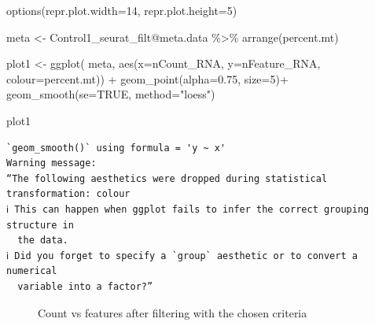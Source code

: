 \documentclass[
  letterpaper,
  DIV=11,
  numbers=noendperiod]{scrartcl}
\newenvironment{Shaded}{\begin{snugshade}}{\end{snugshade}}
\newcommand{\AttributeTok}[1]{\textcolor[rgb]{0.40,0.45,0.13}{#1}}
\newcommand{\ConstantTok}[1]{\textcolor[rgb]{0.56,0.35,0.01}{#1}}
\newcommand{\DecValTok}[1]{\textcolor[rgb]{0.68,0.00,0.00}{#1}}
\newcommand{\FloatTok}[1]{\textcolor[rgb]{0.68,0.00,0.00}{#1}}
\newcommand{\FunctionTok}[1]{\textcolor[rgb]{0.28,0.35,0.67}{#1}}
\newcommand{\NormalTok}[1]{\textcolor[rgb]{0.00,0.23,0.31}{#1}}
\newcommand{\OtherTok}[1]{\textcolor[rgb]{0.00,0.23,0.31}{#1}}
\newcommand{\SpecialCharTok}[1]{\textcolor[rgb]{0.37,0.37,0.37}{#1}}
\newcommand{\StringTok}[1]{\textcolor[rgb]{0.13,0.47,0.30}{#1}}
\begin{document}
\begin{Shaded}
\begin{Highlighting}[]
\FunctionTok{options}\NormalTok{(}\AttributeTok{repr.plot.width=}\DecValTok{14}\NormalTok{, }\AttributeTok{repr.plot.height=}\DecValTok{5}\NormalTok{)}

\NormalTok{meta }\OtherTok{\textless{}{-}}\NormalTok{ Control1\_seurat\_filt}\SpecialCharTok{@}\NormalTok{meta.data }\SpecialCharTok{\%\textgreater{}\%} \FunctionTok{arrange}\NormalTok{(percent.mt)}

\NormalTok{plot1 }\OtherTok{\textless{}{-}} \FunctionTok{ggplot}\NormalTok{( meta, }\FunctionTok{aes}\NormalTok{(}\AttributeTok{x=}\NormalTok{nCount\_RNA, }\AttributeTok{y=}\NormalTok{nFeature\_RNA, }\AttributeTok{colour=}\NormalTok{percent.mt)) }\SpecialCharTok{+} 
         \FunctionTok{geom\_point}\NormalTok{(}\AttributeTok{alpha=}\FloatTok{0.75}\NormalTok{, }\AttributeTok{size=}\DecValTok{5}\NormalTok{)}\SpecialCharTok{+}
         \FunctionTok{geom\_smooth}\NormalTok{(}\AttributeTok{se=}\ConstantTok{TRUE}\NormalTok{, }\AttributeTok{method=}\StringTok{"loess"}\NormalTok{)}

\NormalTok{plot1}
\end{Highlighting}
\end{Shaded}

\begin{verbatim}
`geom_smooth()` using formula = 'y ~ x'
Warning message:
“The following aesthetics were dropped during statistical transformation: colour
ℹ This can happen when ggplot fails to infer the correct grouping structure in
  the data.
ℹ Did you forget to specify a `group` aesthetic or to convert a numerical
  variable into a factor?”
\end{verbatim}

\begin{figure}[H]


\caption{\label{fig-filtrelationship}Count vs features after filtering
with the chosen criteria}

\end{figure}%
\end{document}
